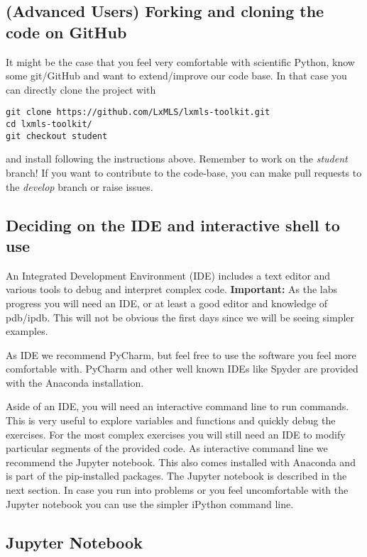 \subsection{(Advanced Users) Forking and cloning the code on GitHub}

It might be the case that you feel very comfortable with scientific Python, know some git/GitHub and want to extend/improve our code base. In that case you can directly clone the project with

\begin{verbatim}
git clone https://github.com/LxMLS/lxmls-toolkit.git 
cd lxmls-toolkit/
git checkout student
\end{verbatim}

\noindent and install following the instructions above. Remember to work on the \textit{student} branch! If you want to contribute to the code-base, you can make pull requests to the \textit{develop} branch or raise issues.

\subsection{Deciding on the IDE and interactive shell to use}

An Integrated Development Environment (IDE) includes a text editor and various tools to debug and interpret complex code. \textbf{Important:} As the labs progress you will need an IDE, or at least a good editor and knowledge of pdb/ipdb. This will not be obvious the first days since we will be seeing simpler examples.

As IDE we recommend PyCharm, but feel free to use the software you feel more comfortable with. PyCharm and other well known IDEs like Spyder are provided with the Anaconda installation.

Aside of an IDE, you will need an interactive command line to run commands. This is very useful to explore variables and functions and quickly debug the exercises. For the most complex exercises you will still need an IDE to modify particular segments of the provided code. As interactive command line we recommend the Jupyter notebook. This also comes installed with Anaconda and is part of the pip-installed packages. The Jupyter notebook is described in the next section. In case you run into problems or you feel uncomfortable with the Jupyter notebook you can use the simpler iPython command line.

\subsection{Jupyter Notebook}

